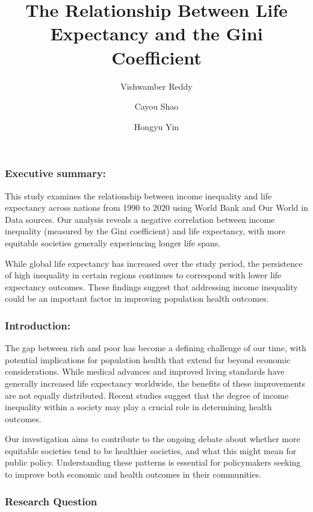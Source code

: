\documentclass[
  11pt,
]{article}
\title{The Relationship Between Life Expectancy and the Gini
Coefficient}
\author{Vishwamber Reddy \and Cayou Shao \and Hongyu Yin}
\date{}
\renewcommand*\contentsname{Table of contents}
\newcommand\contentsname{Table of contents}
\begin{document}
\maketitle

\renewcommand*\contentsname{Table of contents}
{
\hypersetup{linkcolor=}
\setcounter{tocdepth}{3}
\tableofcontents
}

\subsubsection{Executive summary:}\label{executive-summary}

This study examines the relationship between income inequality and life
expectancy across nations from 1990 to 2020 using World Bank and Our
World in Data sources. Our analysis reveals a negative correlation
between income inequality (measured by the Gini coefficient) and life
expectancy, with more equitable societies generally experiencing longer
life spans.

While global life expectancy has increased over the study period, the
persistence of high inequality in certain regions continues to
correspond with lower life expectancy outcomes. These findings suggest
that addressing income inequality could be an important factor in
improving population health outcomes.

\subsubsection{Introduction:}\label{introduction}

The gap between rich and poor has become a defining challenge of our
time, with potential implications for population health that extend far
beyond economic considerations. While medical advances and improved
living standards have generally increased life expectancy worldwide, the
benefits of these improvements are not equally distributed. Recent
studies suggest that the degree of income inequality within a society
may play a crucial role in determining health outcomes.

Our investigation aims to contribute to the ongoing debate about whether
more equitable societies tend to be healthier societies, and what this
might mean for public policy. Understanding these patterns is essential
for policymakers seeking to improve both economic and health outcomes in
their communities.

\subsubsection{Research Question}\label{research-question}
\end{document}
